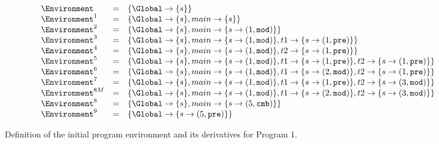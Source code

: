\begin{figure}
	\centering
	$$\begin{array}{l l l}
		\Environment		&=& \left \lbrace
									\Global \to \lbrace s \rbrace
								\right \rbrace		\\
		\Environment^1		&=& \left \lbrace 
									\Global \to \lbrace s \rbrace,
									main \to \lbrace s \rbrace 
								\right \rbrace		\\
		\Environment^2		&=& \left \lbrace 
									\Global \to \lbrace s \rbrace,
									main \to \lbrace s \to (1, \mathtt{mod}) \rbrace
								\right \rbrace		\\
		\Environment^3		&=& \left \lbrace 
									\Global \to \lbrace s \rbrace,
									main \to \lbrace s \to (1, \mathtt{mod}) \rbrace,
									t1 \to \lbrace s \to (1, \mathtt{pre}) \rbrace
								\right \rbrace		\\
		\Environment^4		&=& \left \lbrace 
									\Global \to \lbrace s \rbrace,
									main \to \lbrace s \to (1, \mathtt{mod}) \rbrace,
									t2 \to \lbrace s \to (1, \mathtt{pre}) \rbrace
								\right \rbrace		\\
		\Environment^5		&=& \left \lbrace 
									\Global \to \lbrace s \rbrace,
									main \to \lbrace s \to (1, \mathtt{mod}) \rbrace,
									t1 \to \lbrace s \to (1, \mathtt{pre}) \rbrace,
									t2 \to \lbrace s \to (1, \mathtt{pre}) \rbrace
								\right \rbrace		\\
		\Environment^6		&=& \left \lbrace 
									\Global \to \lbrace s \rbrace,
									main \to \lbrace s \to (1, \mathtt{mod}) \rbrace,
									t1 \to \lbrace s \to (2, \mathtt{mod}) \rbrace,
									t2 \to \lbrace s \to (1, \mathtt{pre}) \rbrace
								\right \rbrace		\\
		\Environment^7		&=& \left \lbrace 
									\Global \to \lbrace s \rbrace,
									main \to \lbrace s \to (1, \mathtt{mod}) \rbrace,
									t1 \to \lbrace s \to (1, \mathtt{pre}) \rbrace,
									t2 \to \lbrace s \to (3, \mathtt{mod}) \rbrace
								\right \rbrace		\\
		\Environment^{8M}	&=& \left \lbrace 
									\Global \to \lbrace s \rbrace,
									main \to \lbrace s \to (1, \mathtt{mod}) \rbrace,
									t1 \to \lbrace s \to (2, \mathtt{mod}) \rbrace,
									t2 \to \lbrace s \to (3, \mathtt{mod}) \rbrace
								\right \rbrace		\\
		\Environment^8		&=& \left \lbrace 
									\Global \to \lbrace s \rbrace,
									main \to \lbrace s \to (5, \mathtt{cmb}) \rbrace
								\right \rbrace		\\
		\Environment^9		&=& \left \lbrace
									\Global \to \lbrace s \to (5, \mathtt{pre}) \rbrace
								\right \rbrace		\\
	\end{array}$$
	
	\caption{Definition of the initial program environment and its derivatives for Program 1.}
	\label{figure:forec_program_1}
\end{figure}


